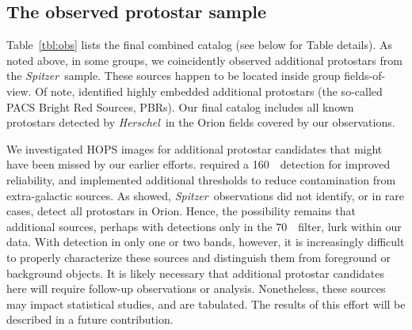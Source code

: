 \documentclass[manuscript]{aastex}
\newcommand{\herschel}{{\em Herschel}}
\newcommand{\spitzer}{{\em Spitzer}}
\begin{document}
\subsection{The observed protostar sample}
\label{sec:protostars}
Table~\ref{tbl:obs} lists the final combined catalog (see below for Table details).  As noted above, in some groups, we coincidently observed additional protostars from the \citet{orion} \spitzer\ sample.  These sources happen to be located inside group fields-of-view.   Of note, \citet{pbrpaper} identified highly embedded additional protostars (the so-called PACS Bright Red Sources, PBRs).  Our final catalog includes all known protostars detected by \herschel\ in the Orion fields covered by our observations.
\par
We investigated HOPS images for additional protostar candidates that might have been missed by our earlier efforts.  \citet{pbrpaper} required a 160~\micron\ detection for improved reliability, and implemented additional thresholds to reduce contamination from extra-galactic sources.  As \citet{pbrpaper} showed, \spitzer\ observations did not identify, or in rare cases, detect all protostars in Orion.  Hence, the possibility remains that additional sources, perhaps with detections only in the 70~\micron\ filter, lurk within our data.  With detection in only one or two bands, however, it is increasingly difficult to properly characterize these sources and distinguish them from foreground or background objects.  It is likely necessary that additional protostar candidates here will require follow-up observations or analysis.  Nonetheless, these sources may impact statistical studies, and are tabulated.  The results of this effort will be described in a future contribution.
\par
\end{document}
